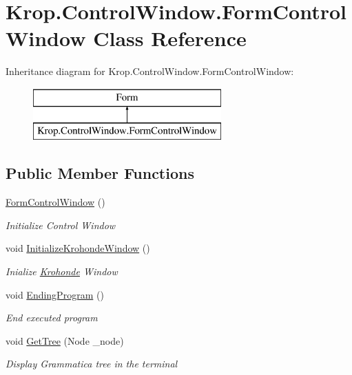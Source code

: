 \hypertarget{class_krop_1_1_control_window_1_1_form_control_window}{}\section{Krop.\+Control\+Window.\+Form\+Control\+Window Class Reference}
\label{class_krop_1_1_control_window_1_1_form_control_window}
Inheritance diagram for Krop.\+Control\+Window.\+Form\+Control\+Window\+:\begin{figure}[H]
\begin{center}
\leavevmode
\includegraphics[height=2.000000cm]{class_krop_1_1_control_window_1_1_form_control_window}
\end{center}
\end{figure}
\subsection*{Public Member Functions}
\begin{DoxyCompactItemize}
\item 
\mbox{\hyperlink{class_krop_1_1_control_window_1_1_form_control_window_a094e44c9dbbe99ed8b83f63a1fc923b3}{Form\+Control\+Window}} ()
\begin{DoxyCompactList}\small\item\em Initialize Control Window \end{DoxyCompactList}\item 
void \mbox{\hyperlink{class_krop_1_1_control_window_1_1_form_control_window_a2b631b3483ebce4ba41da11c5a4b6cbd}{Initialize\+Krohonde\+Window}} ()
\begin{DoxyCompactList}\small\item\em Inialize \mbox{\hyperlink{namespace_krop_1_1_krohonde}{Krohonde}} Window \end{DoxyCompactList}\item 
void \mbox{\hyperlink{class_krop_1_1_control_window_1_1_form_control_window_ac4bdb9aee85bfb9c8f637e6919a49351}{Ending\+Program}} ()
\begin{DoxyCompactList}\small\item\em End executed program \end{DoxyCompactList}\item 
void \mbox{\hyperlink{class_krop_1_1_control_window_1_1_form_control_window_a27bd413aa79e780a7f8d9284cdd8f72d}{Get\+Tree}} (Node \+\_\+node)
\begin{DoxyCompactList}\small\item\em Display Grammatica tree in the terminal \end{DoxyCompactList}\end{DoxyCompactItemize}
